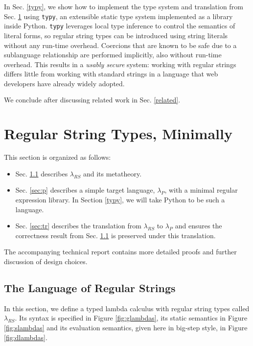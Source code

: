 \documentclass[10pt]{sigplanconf}
\theoremstyle{definition}
\newcommand{\lambdas}{\lambda_{RS}}
\newcommand{\lambdap}{\lambda_P}
\begin{document}
In Sec. \ref{typy}, we show how to implement the type system and translation from Sec. \ref{calculus} using \texttt{typy}, an extensible static type system implemented as a library inside Python. \texttt{typy} leverages local type inference to control the semantics of literal forms, so regular string types can be introduced using string literals without any run-time overhead. Coercions that are known to be  safe due to a sublanguage relationship are performed implicitly, also without run-time overhead. This results in a \emph{usably secure} system: working with regular strings differs little from working with standard strings in a language that web developers have already widely adopted.

We conclude after discussing related work in Sec. \ref{related}.

\section{Regular String Types, Minimally}\label{calculus}
\noindent
This section is organized as follows:
\begin{itemize}
\item Sec. \ref{sec:rs} describes $\lambda_{RS}$ and its metatheory.%
\item Sec. \ref{sec:p} describes a simple target language, $\lambdap$, with a minimal regular expression library. In Section \ref{typy}, we will take Python to be such a language.
\item Sec. \ref{sec:tr} describes the translation from $\lambdas$ to $\lambdap$ and ensures the correctness result from Sec. \ref{sec:rs} is preserved under this translation. 
\end{itemize}

The accompanying technical report \cite{psptr} contains more detailed proofs and further discussion of  design choices.%

\subsection{The Language of Regular Strings}\label{sec:rs}
In this section, we define a typed lambda calculus with regular string types called $\lambda_{RS}$. Its syntax is specified in Figure \ref{fig:glambdas}, its static semantics in Figure \ref{fig:slambdas} and its evaluation semantics, given here in big-step style, in Figure \ref{fig:dlambdas}.
\end{document}
